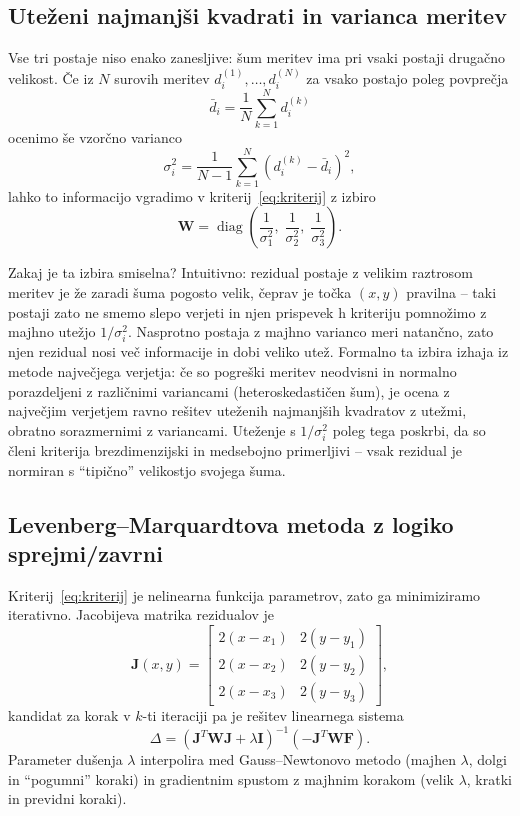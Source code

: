 \documentclass[a4paper,11pt]{article}
\begin{document}
\subsection{Uteženi najmanjši kvadrati in varianca meritev}
\label{sec:wls}
Vse tri postaje niso enako zanesljive: šum meritev ima pri vsaki postaji drugačno velikost. Če iz $N$ surovih meritev $d_i^{(1)},\dots,d_i^{(N)}$ za vsako postajo poleg povprečja
\[
\bar{d}_i = \frac{1}{N}\sum_{k=1}^{N} d_i^{(k)}
\]
ocenimo še vzorčno varianco
\[
\sigma_i^2 = \frac{1}{N-1}\sum_{k=1}^{N} \left(d_i^{(k)} - \bar{d}_i\right)^2,
\]
lahko to informacijo vgradimo v kriterij~\eqref{eq:kriterij} z izbiro
\begin{equation}
\mathbf{W} = \operatorname{diag}\!\left(\frac{1}{\sigma_1^2},\; \frac{1}{\sigma_2^2},\; \frac{1}{\sigma_3^2}\right).
\label{eq:W}
\end{equation}

Zakaj je ta izbira smiselna? Intuitivno: rezidual postaje z velikim raztrosom meritev je že zaradi šuma pogosto velik, čeprav je točka $(x,y)$ pravilna -- taki postaji zato ne smemo slepo verjeti in njen prispevek h kriteriju pomnožimo z majhno utežjo $1/\sigma_i^2$. Nasprotno postaja z majhno varianco meri natančno, zato njen rezidual nosi več informacije in dobi veliko utež. Formalno ta izbira izhaja iz metode največjega verjetja: če so pogreški meritev neodvisni in normalno porazdeljeni z različnimi variancami (heteroskedastičen šum), je ocena z največjim verjetjem ravno rešitev uteženih najmanjših kvadratov z utežmi, obratno sorazmernimi z variancami. Uteženje s $1/\sigma_i^2$ poleg tega poskrbi, da so členi kriterija brezdimenzijski in medsebojno primerljivi -- vsak rezidual je normiran s ``tipično'' velikostjo svojega šuma.

\subsection{Levenberg--Marquardtova metoda z logiko sprejmi/zavrni}
\label{sec:lm}
Kriterij~\eqref{eq:kriterij} je nelinearna funkcija parametrov, zato ga minimiziramo iterativno. Jacobijeva matrika rezidualov je
\[
\mathbf{J}(x,y)=
\begin{bmatrix}
2(x-x_1) & 2(y-y_1) \\
2(x-x_2) & 2(y-y_2) \\
2(x-x_3) & 2(y-y_3)
\end{bmatrix},
\]
kandidat za korak v $k$-ti iteraciji pa je rešitev linearnega sistema
\begin{equation}
\Delta = \left(\mathbf{J}^T \mathbf{W} \mathbf{J} + \lambda \mathbf{I}\right)^{-1}\left(-\mathbf{J}^T \mathbf{W} \mathbf{F}\right).
\label{eq:step}
\end{equation}
Parameter dušenja $\lambda$ interpolira med Gauss--Newtonovo metodo (majhen $\lambda$, dolgi in ``pogumni'' koraki) in gradientnim spustom z majhnim korakom (velik $\lambda$, kratki in previdni koraki).
\end{document}
